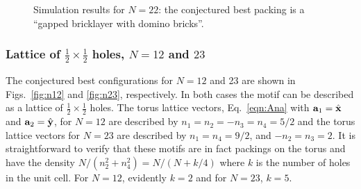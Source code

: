 \documentclass[aps]{revtex4}
\newcommand{\ax}{{\bf a}_1}
\newcommand{\ay}{{\bf a}_2}
\begin{document}
\begin{figure}[H]
\caption{\label{fig:n22}Simulation results for $N=22$: the conjectured best packing is a ``gapped bricklayer with domino bricks''.}
\end{figure}

\subsubsection{Lattice of $\frac{1}{2}\times\frac{1}{2}$ holes, $N=12$ and $23$}
The conjectured best configurations for $N=12$ and 23 are shown in Figs.\ \ref{fig:n12} and \ref{fig:n23}, respectively.  In both cases the motif can be described as a lattice of $\frac{1}{2}\times\frac{1}{2}$ holes.  The torus lattice vectors, Eq.\ \ref{eqn:Ana} with $\ax=\hat{{\bf x}}$ and $\ay=\hat{{\bf y}}$, for $N=12$ are described by $n_1=n_2=-n_3=n_4=5/2$ and the torus lattice vectors for $N=23$ are described by $n_1=n_4=9/2$, and $-n_2=n_3=2$.  It is straightforward to verify that these motifs are in fact packings on the torus and have the density $N/(n_2^2 + n_4^2)=N/(N+k/4)$ where $k$ is the number of holes in the unit cell.  For $N=12$, evidently $k=2$ and for $N=23$, $k=5$. 
\end{document}
